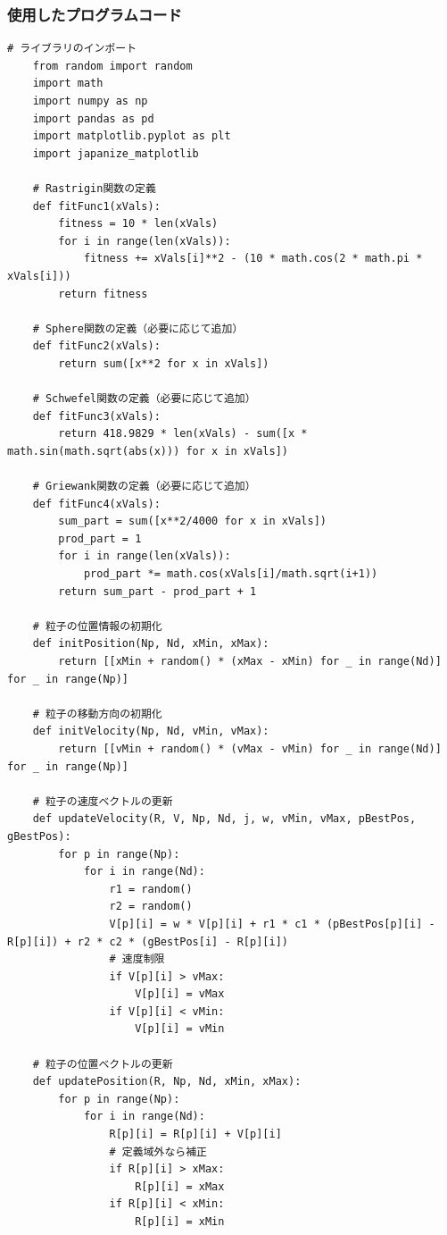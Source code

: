 \subsubsection{使用したプログラムコード}
\begin{lstlisting}[caption=LDIWM を用いた PSO実験コード, label=lst:kadai2_code]
    # ライブラリのインポート
    from random import random
    import math
    import numpy as np
    import pandas as pd
    import matplotlib.pyplot as plt
    import japanize_matplotlib
    
    # Rastrigin関数の定義
    def fitFunc1(xVals):
        fitness = 10 * len(xVals)
        for i in range(len(xVals)):
            fitness += xVals[i]**2 - (10 * math.cos(2 * math.pi * xVals[i]))
        return fitness
    
    # Sphere関数の定義（必要に応じて追加）
    def fitFunc2(xVals):
        return sum([x**2 for x in xVals])
    
    # Schwefel関数の定義（必要に応じて追加）
    def fitFunc3(xVals):
        return 418.9829 * len(xVals) - sum([x * math.sin(math.sqrt(abs(x))) for x in xVals])
    
    # Griewank関数の定義（必要に応じて追加）
    def fitFunc4(xVals):
        sum_part = sum([x**2/4000 for x in xVals])
        prod_part = 1
        for i in range(len(xVals)):
            prod_part *= math.cos(xVals[i]/math.sqrt(i+1))
        return sum_part - prod_part + 1
    
    # 粒子の位置情報の初期化
    def initPosition(Np, Nd, xMin, xMax):
        return [[xMin + random() * (xMax - xMin) for _ in range(Nd)] for _ in range(Np)]
    
    # 粒子の移動方向の初期化
    def initVelocity(Np, Nd, vMin, vMax):
        return [[vMin + random() * (vMax - vMin) for _ in range(Nd)] for _ in range(Np)]
    
    # 粒子の速度ベクトルの更新
    def updateVelocity(R, V, Np, Nd, j, w, vMin, vMax, pBestPos, gBestPos):
        for p in range(Np):
            for i in range(Nd):
                r1 = random()
                r2 = random()
                V[p][i] = w * V[p][i] + r1 * c1 * (pBestPos[p][i] - R[p][i]) + r2 * c2 * (gBestPos[i] - R[p][i])
                # 速度制限
                if V[p][i] > vMax:
                    V[p][i] = vMax
                if V[p][i] < vMin:
                    V[p][i] = vMin
    
    # 粒子の位置ベクトルの更新
    def updatePosition(R, Np, Nd, xMin, xMax):
        for p in range(Np):
            for i in range(Nd):
                R[p][i] = R[p][i] + V[p][i]
                # 定義域外なら補正
                if R[p][i] > xMax:
                    R[p][i] = xMax
                if R[p][i] < xMin:
                    R[p][i] = xMin
    

\end{lstlisting}
